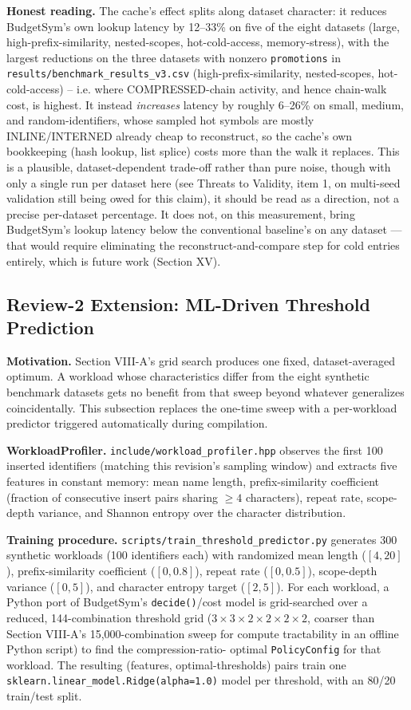 \documentclass[conference]{IEEEtran}
\begin{document}
\textbf{Honest reading.} The cache's effect splits along dataset character:
it reduces BudgetSym's own lookup latency by 12--33\% on five of the eight
datasets (large, high-prefix-similarity, nested-scopes, hot-cold-access,
memory-stress), with the largest reductions on the three datasets with
nonzero \texttt{promotions} in \texttt{results/benchmark\_results\_v3.csv}
(high-prefix-similarity, nested-scopes, hot-cold-access) -- i.e. where
COMPRESSED-chain activity, and hence chain-walk cost, is highest. It instead
\emph{increases} latency by roughly 6--26\% on small, medium, and
random-identifiers, whose sampled hot symbols are mostly INLINE/INTERNED
already cheap to reconstruct, so the cache's own bookkeeping (hash lookup,
list splice) costs more than the walk it replaces. This is a plausible,
dataset-dependent trade-off rather than pure noise, though with only a
single run per dataset here (see Threats to Validity, item 1, on multi-seed
validation still being owed for this claim), it should be read as a
direction, not a precise per-dataset percentage. It does not, on this measurement, bring
BudgetSym's lookup latency below the conventional baseline's on any dataset
--- that would require eliminating the reconstruct-and-compare step for cold
entries entirely, which is future work (Section XV).

\subsection{Review-2 Extension: ML-Driven Threshold Prediction}
\textbf{Motivation.} Section VIII-A's grid search produces one fixed,
dataset-averaged optimum. A workload whose characteristics differ from the
eight synthetic benchmark datasets gets no benefit from that sweep beyond
whatever generalizes coincidentally. This subsection replaces the one-time
sweep with a per-workload predictor triggered automatically during
compilation.

\textbf{WorkloadProfiler.} \texttt{include/workload\_profiler.hpp} observes
the first 100 inserted identifiers (matching this revision's sampling window)
and extracts five features in constant memory: mean name length,
prefix-similarity coefficient (fraction of consecutive insert pairs sharing
$\geq 4$ characters), repeat rate, scope-depth variance, and Shannon entropy
over the character distribution.

\textbf{Training procedure.} \texttt{scripts/train\_threshold\_predictor.py}
generates 300 synthetic workloads (100 identifiers each) with randomized
mean length ($[4,20]$), prefix-similarity coefficient ($[0,0.8]$), repeat
rate ($[0,0.5]$), scope-depth variance ($[0,5]$), and character entropy
target ($[2,5]$). For each workload, a Python port of BudgetSym's
\texttt{decide()}/cost model is grid-searched over a reduced,
144-combination threshold grid ($3\times3\times2\times2\times2\times2$,
coarser than Section VIII-A's 15,000-combination sweep for compute
tractability in an offline Python script) to find the compression-ratio-
optimal \texttt{PolicyConfig} for that workload. The resulting
(features, optimal-thresholds) pairs train one
\texttt{sklearn.linear\_model.Ridge(alpha=1.0)} model per threshold, with an
80/20 train/test split.
\end{document}
